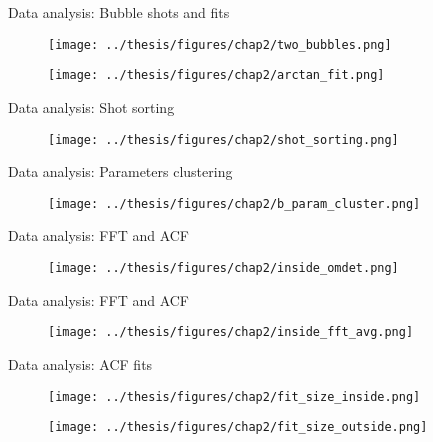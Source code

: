 \documentclass[aspectratio=169]{beamer}
\begin{document}
\begin{frame}{Data analysis: Bubble shots and fits}
  \vspace{-0.2cm}
  \begin{figure}
      \centering
      \texttt{[image: ../thesis/figures/chap2/two\_bubbles.png]}
  \end{figure}
  \vspace{-0.5cm}
  \begin{figure}
      \centering
      \texttt{[image: ../thesis/figures/chap2/arctan\_fit.png]}
  \end{figure}
\end{frame}

\begin{frame}{Data analysis: Shot sorting}
  \begin{figure}
      \centering
      \texttt{[image: ../thesis/figures/chap2/shot\_sorting.png]}
  \end{figure}
\end{frame}

\begin{frame}{Data analysis: Parameters clustering}
  \vspace{-0.2cm}
  \begin{figure}
      \centering
      \texttt{[image: ../thesis/figures/chap2/b\_param\_cluster.png]}
  \end{figure}
\end{frame}

\begin{frame}{Data analysis: FFT and ACF}
  \vspace{-0.2cm}
  \begin{figure}
      \centering
      \texttt{[image: ../thesis/figures/chap2/inside\_omdet.png]}
  \end{figure}
\end{frame}

\begin{frame}{Data analysis: FFT and ACF}
  \begin{figure}
      \centering
      \texttt{[image: ../thesis/figures/chap2/inside\_fft\_avg.png]}
  \end{figure}
\end{frame}

\begin{frame}{Data analysis: ACF fits}
  \begin{figure}
      \centering
      \texttt{[image: ../thesis/figures/chap2/fit\_size\_inside.png]}
  \end{figure}
  \vspace{-0.5cm}
  \begin{figure}
      \centering
      \texttt{[image: ../thesis/figures/chap2/fit\_size\_outside.png]}
  \end{figure}
\end{frame}
\end{document}

